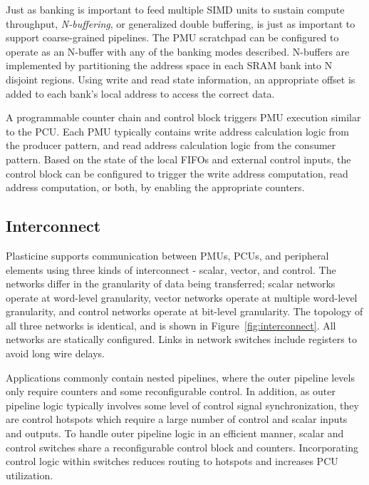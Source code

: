 Just as banking is important to feed multiple SIMD units to sustain compute throughput, \emph{N-buffering}, or generalized double buffering,
is just as important to support coarse-grained pipelines. The PMU scratchpad can be configured to operate as an N-buffer with any
of the banking modes described. N-buffers are implemented by partitioning the address space in each SRAM bank into N disjoint regions.
Using write and read state information, an appropriate offset is added to each bank's local address to access the correct data.

A programmable counter chain and control block triggers PMU execution similar to the PCU. Each PMU typically contains write address
calculation logic from the producer pattern, and read address calculation logic from the consumer pattern. Based on the state of
the local FIFOs and external control inputs, the control block can be configured to trigger the write address computation, read
address computation, or both, by enabling the appropriate counters.

\subsection{Interconnect}
\label{ssec:Interconnect}
Plasticine supports communication between PMUs, PCUs, and peripheral elements using
three kinds of interconnect - scalar, vector, and control. The networks differ in the granularity of
data being transferred; scalar networks operate at word-level granularity, vector networks operate at
multiple word-level granularity, and control networks operate at bit-level granularity. The topology
of all three networks is identical, and is shown in Figure~\ref{fig:interconnect}. All networks are
statically configured. Links in network switches include registers to avoid long wire delays.

Applications commonly contain nested pipelines, where the outer pipeline levels 
only require counters and some reconfigurable control. In addition, as outer pipeline logic
typically involves some level of control signal synchronization, they are control hotspots
which require a large number of control and scalar inputs and outputs. To handle outer pipeline logic in
an efficient manner, scalar and control switches share a reconfigurable control block and counters.
Incorporating control
logic within switches reduces routing to hotspots and increases PCU utilization.




